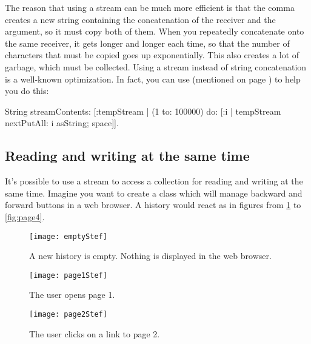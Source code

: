 \documentclass[a4paper,10pt,twoside]{book}
\begin{document}
The reason that using a stream can be much more efficient is that the comma creates a new string containing the concatenation of the receiver and the argument, so it must copy both of them.
When you repeatedly concatenate onto the same receiver, it gets longer and longer each time, so that the number of characters that must be copied goes up exponentially.
This also creates a lot of garbage, which must be collected.
Using a stream instead of string concatenation is a well-known optimization.
In fact, you can use  (mentioned on page \pageref{sec:streamContents}) to help you do this:

\begin{code}{}
String streamContents: [:tempStream |
  (1 to: 100000) do: [:i |
    tempStream nextPutAll: i asString; space]].
\end{code}

\subsection{Reading and writing at the same time}

It's possible to use a stream to access a collection for reading and writing at the same time.
Imagine you want to create a  class which will manage backward and forward buttons in a web browser.
A history would react as in figures from \ref{fig:emptyStream} to \ref{fig:page4}.

\begin{figure}[!ht]
\centerline{\texttt{[image: emptyStef]}}
\caption{A new history is empty. Nothing is displayed in the web browser.}
\label{fig:emptyStream}
\vspace{.2in}
\end{figure}

\begin{figure}[!ht]
\centerline{\texttt{[image: page1Stef]}}
\caption{The user opens page 1.}
\label{fig:page1}
\vspace{.2in}
\end{figure}

\begin{figure}[!ht]
\centerline{\texttt{[image: page2Stef]}}
\caption{The user clicks on a link to page 2.}
\label{fig:page2}
\vspace{.2in}
\end{figure}
\end{document}
